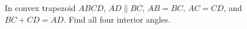 In convex trapezoid $ABCD$, $AD\parallel BC$, $AB=BC$, $AC=CD$, and $BC+CD=AD$. Find all four interior angles.
